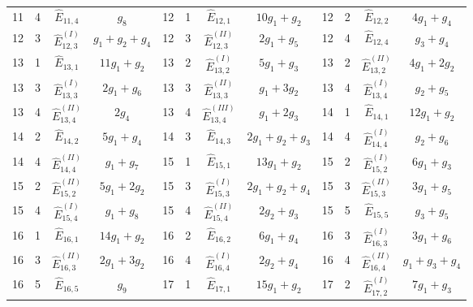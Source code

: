 \documentclass[a4paper,11pt]{article}
\begin{document}
\begin{table}
\begin{center}
{\begin{tabular}{|cccc|cccc|cccc|}
11  &  4  &  $\widehat{E}_{11,4}$  &  $g_{8}$    &    12  &  1  &  $\widehat{E}_{12,1}$  &  $10g_{1}+g_{2}$    &    12  &  2  &  $\widehat{E}_{12,2}$  &  $4g_{1}+g_{4}$\\
12  &  3  &  $\widehat{E}_{12,3}^{(I)}$  &  $g_{1}+g_{2}+g_{4}$    &    12  &  3  &  $\widehat{E}_{12,3}^{(II)}$  &  $2g_{1}+g_{5}$    &    12  &  4  &  $\widehat{E}_{12,4}$  &  $g_{3}+g_{4}$\\
13  &  1  &  $\widehat{E}_{13,1}$  &  $11g_{1}+g_{2}$    &    13  &  2  &  $\widehat{E}_{13,2}^{(I)}$  &  $5g_{1}+g_{3}$    &    13  &  2  &  $\widehat{E}_{13,2}^{(II)}$  &  $4g_{1}+2g_{2}$\\
13  &  3  &  $\widehat{E}_{13,3}^{(I)}$  &  $2g_{1}+g_{6}$    &    13  &  3  &  $\widehat{E}_{13,3}^{(II)}$  &  $g_{1}+3g_{2}$    &    13  &  4  &  $\widehat{E}_{13,4}^{(I)}$  &  $g_{2}+g_{5}$\\
13  &  4  &  $\widehat{E}_{13,4}^{(II)}$  &  $2g_{4}$    &    13  &  4  &  $\widehat{E}_{13,4}^{(III)}$  &  $g_{1}+2g_{3}$    &    14  &  1  &  $\widehat{E}_{14,1}$  &  $12g_{1}+g_{2}$\\
14  &  2  &  $\widehat{E}_{14,2}$  &  $5g_{1}+g_{4}$    &    14  &  3  &  $\widehat{E}_{14,3}$  &  $2g_{1}+g_{2}+g_{3}$    &    14  &  4  &  $\widehat{E}_{14,4}^{(I)}$  &  $g_{2}+g_{6}$\\
14  &  4  &  $\widehat{E}_{14,4}^{(II)}$  &  $g_{1}+g_{7}$    &    15  &  1  &  $\widehat{E}_{15,1}$  &  $13g_{1}+g_{2}$    &    15  &  2  &  $\widehat{E}_{15,2}^{(I)}$  &  $6g_{1}+g_{3}$\\
15  &  2  &  $\widehat{E}_{15,2}^{(II)}$  &  $5g_{1}+2g_{2}$    &    15  &  3  &  $\widehat{E}_{15,3}^{(I)}$  &  $2g_{1}+g_{2}+g_{4}$    &    15  &  3  &  $\widehat{E}_{15,3}^{(II)}$  &  $3g_{1}+g_{5}$\\
15  &  4  &  $\widehat{E}_{15,4}^{(I)}$  &  $g_{1}+g_{8}$    &    15  &  4  &  $\widehat{E}_{15,4}^{(II)}$  &  $2g_{2}+g_{3}$    &    15  &  5  &  $\widehat{E}_{15,5}$  &  $g_{3}+g_{5}$\\
16  &  1  &  $\widehat{E}_{16,1}$  &  $14g_{1}+g_{2}$    &    16  &  2  &  $\widehat{E}_{16,2}$  &  $6g_{1}+g_{4}$    &    16  &  3  &  $\widehat{E}_{16,3}^{(I)}$  &  $3g_{1}+g_{6}$\\
16  &  3  &  $\widehat{E}_{16,3}^{(II)}$  &  $2g_{1}+3g_{2}$    &    16  &  4  &  $\widehat{E}_{16,4}^{(I)}$  &  $2g_{2}+g_{4}$    &    16  &  4  &  $\widehat{E}_{16,4}^{(II)}$  &  $g_{1}+g_{3}+g_{4}$\\
16  &  5  &  $\widehat{E}_{16,5}$  &  $g_{9}$    &    17  &  1  &  $\widehat{E}_{17,1}$  &  $15g_{1}+g_{2}$    &    17  &  2  &  $\widehat{E}_{17,2}^{(I)}$  &  $7g_{1}+g_{3}$\\

\end{tabular}}
\end{center}
\end{table}
\end{document}
